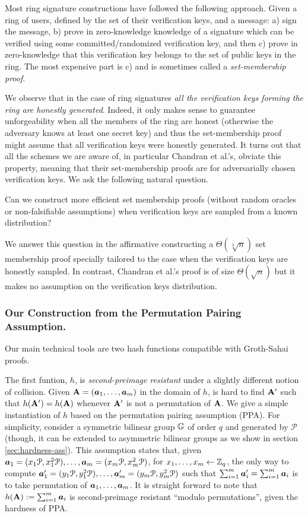 
Most ring signature constructions have followed the following approach. Given a ring of users, defined by the set of their verification keys, and a message: a) sign the message, b) prove in zero-knowledge knowledge of a signature which can be verified using some committed/randomized verification key, and then c) prove in zero-knowledge that this verification key belongs to the set of public keys in the ring.  The most expensive part is c) and is sometimes called a \emph{set-membership proof}.

We observe that in the case of ring signatures \emph{all the verification keys forming the ring are honestly generated}. 
Indeed, it only makes sense to guarantee unforgeability when all the members of the ring are honest (otherwise the adversary knows at least one secret key) and thus the set-membership proof might assume that all verification keys were honestly generated.
It turns out that all the schemes we are aware of, in particular Chandran et al.'s, obviate this property, meaning that their set-membership proofs are for adversarially chosen verification keys.
We ask the following natural question.
\begin{displayquote}
Can we construct more efficient set membership proofs (without random oracles or non-falsifiable assumptions) when verification keys are sampled from a known distribution?
\end{displayquote}
We answer this question in the affirmative constructing a $\Theta(\sqrt[3]{n})$ set membership proof specially tailored to the case when the verification keys are honestly sampled. In contrast, Chandran et al.'s proof is of size $\Theta(\sqrt{n})$ but it makes no assumption on the verification keys distribution.

\subsubsection{Our Construction from the Permutation Pairing Assumption.}
Our main technical tools are two hash functions compatible with Groth-Sahai proofs.

The first funtion, $h$, is \emph{second-preimage resistant} under a slightly different notion of collision. Given $\mathbf{{A}}=({\boldsymbol{a}}_1,\ldots,\allowbreak {\boldsymbol{a}}_m)$ in the domain of $h$, is hard to find $\mathbf{{A}}'$ such that $h(\mathbf{{A}}')=h(\mathbf{{A}})$ whenever $\mathbf{{A}}'$ is not a permutation of $\mathbf{{A}}$.
We give a simple instantiation of $h$ based on the permutation pairing assumption (PPA). For simplicity, consider a symmetric bilinear group $\mathbb{G}$ of order $q$ and generated by $\mathcal{P}$ (though, it can be extended to asymmetric bilinear groups as we show in section \ref{sec:hardness-ass}). This assumption states that, given ${\boldsymbol{a}}_1 = (x_1\mathcal{P},x_1^2\mathcal{P}),\ldots,{\boldsymbol{a}}_m=(x_m\mathcal{P},x^2_m\mathcal{P})$, for $x_1,\ldots,x_m\gets\mathbb{Z}_q$, the only way to compute ${\boldsymbol{a}}'_1=(y_1\mathcal{P},y_1^2\mathcal{P}),\ldots,{\boldsymbol{a}}'_m=(y_m\mathcal{P},y_m^2\mathcal{P})$ such that $\sum_{i=1}^m {\boldsymbol{a}}'_i = \sum_{i=1}^m{\boldsymbol{a}}_i$ is to take permutation of ${\boldsymbol{a}}_1,\ldots,{\boldsymbol{a}}_m$.  It is straight forward to note that $h(\mathbf{{A}}) := \sum_{i=1}^m {\boldsymbol{a}}_i$ is second-preimage resistant ``modulo permutations'', given the hardness of PPA.

